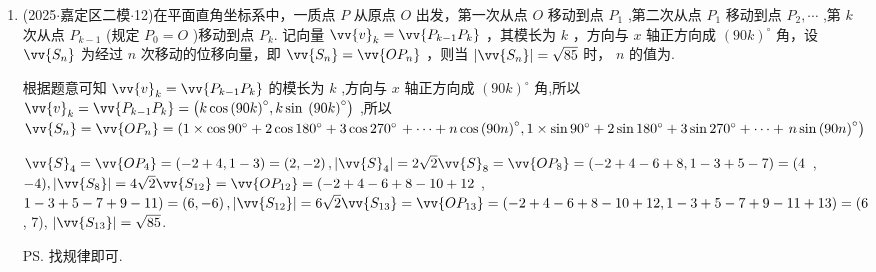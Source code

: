 \begin{enumerate}
    \item (2025$\cdot$嘉定区二模$\cdot$12)在平面直角坐标系中，一质点 $P$ 从原点 $O$ 出发，第一次从点 $O$ 移动到点 ${P}_{1}$ ,第二次从点 ${P}_{1}$ 移动到点 ${P}_{2},\cdots$ ,第 $k$ 次从点 ${P}_{k - 1}$ (规定 ${P}_{0} = O$ )移动到点 ${P}_{k}$. 记向量 ${\vv{v}}_{k} =  \vv{{P}_{k - 1}{P}_{k}}$ ，其模长为 $k$ ，方向与 $x$ 轴正方向成 ${\left( {90}k\right) }^{ \circ  }$ 角，设 $\vv{{S}_{n}}$ 为经过 $n$ 次移动的位移向量，即 $\vv{{S}_{n}} =  \vv{O{P}_{n}}$ ，则当 $\left| \vv{{S}_{n}}\right|  = \sqrt{85}$ 时， $n$ 的值为.
    \begin{jieda}
        根据题意可知 ${\vv{v}}_{k} = \vv{{P}_{k - 1}{P}_{k}}$ 的模长为 $k$ ,方向与 $x$ 轴正方向成 ${\left( {90}k\right) }^{ \circ  }$ 角,所以 ${\vv{v}}_{k} = \vv{{P}_{k - 1}{P}_{k}} = \left( {k\cos {\left( {90}k\right) }^{ \circ  },k\sin }\right.  \left. {\left( {90}k\right) }^{ \circ  }\right)$ ,所以 $\vv{{S}_{n}} = \vv{O{P}_{n}} = \left( {1 \times  \cos {90}^{ \circ  } + 2\cos {180}^{ \circ  } + 3\cos {270}^{ \circ  }}\right.  + \cdots  + n\cos {\left( {90}n\right) }^{ \circ  },1 \times  \sin {90}^{ \circ  } + 2\sin {180}^{ \circ  } + 3\sin {270}^{ \circ  } + \cdots  +  \left. {n\sin {\left( {90}n\right) }^{ \circ  }}\right)$
        
        ${\vv{S}}_{4} = \vv{O{P}_{4}} = \left( {-2 + 4,1 - 3}\right)  = \left( {2, - 2}\right),\left| {\vv{S}}_{4}\right|  = 2\sqrt{2}\\
        {\vv{S}}_{8} = \vv{O{P}_{8}} = \left( {-2 + 4 - 6 + 8,1 - 3 + 5 - 7}\right)  = (4$ , $- 4),\left| \vv{{S}_{8}}\right|  = 4\sqrt{2}\\
        \vv{{S}_{12}} = \vv{O{P}_{12}} = ( - 2 + 4 - 6 + 8 - {10} + {12}$ , $1 - 3 + 5 - 7 + 9 - {11}) = \left( {6, - 6}\right) ,\left| \vv{{S}_{12}}\right|  = 6\sqrt{2}\\
        \vv{{S}_{13}} = \vv{O{P}_{13}} =  \left( {-2 + 4 - 6 + 8 - {10} + {12},1 - 3 + 5 - 7 + 9 - {11} + {13}}\right)  = (6$ , 7), $\left| \vv{{S}_{13}}\right|  = \sqrt{85}$.
        
        \ps 找规律即可.
    \end{jieda}


\end{enumerate}

